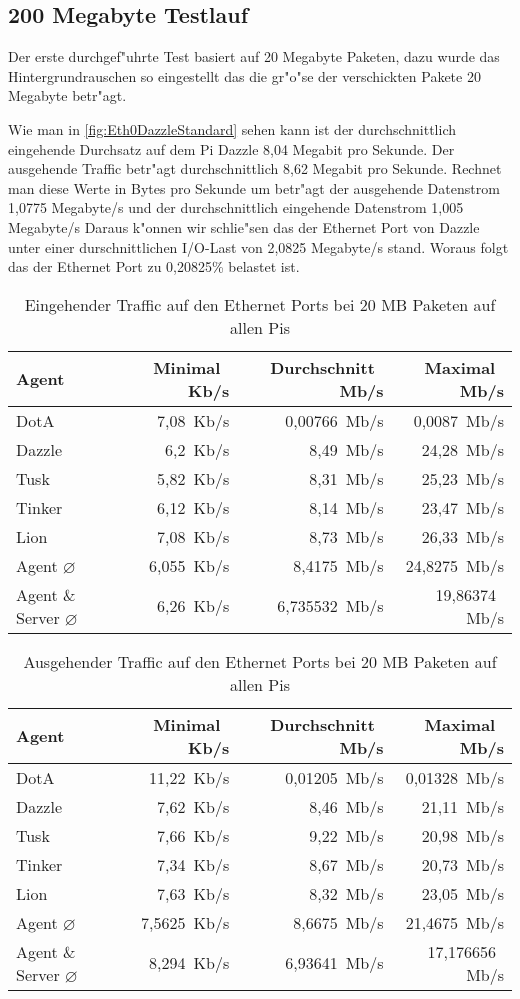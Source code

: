 \subsection{200 Megabyte Testlauf}
\label{subsec:200MBTest}
Der erste durchgef"uhrte Test basiert auf 20 Megabyte Paketen, dazu wurde das Hintergrundrauschen %
so eingestellt das die gr"o"se der verschickten Pakete 20 Megabyte betr"agt. 

Wie man in \cref{fig:Eth0DazzleStandard} sehen kann ist der durchschnittlich eingehende Durchsatz auf dem Pi Dazzle 8,04 Megabit %
pro Sekunde. Der ausgehende Traffic betr"agt durchschnittlich 8,62 Megabit pro Sekunde. Rechnet man diese Werte in Bytes pro Sekunde um %
betr"agt der ausgehende Datenstrom 1,0775 Megabyte/s und der durchschnittlich eingehende Datenstrom 1,005 Megabyte/s %
Daraus k"onnen wir schlie"sen das der Ethernet Port von Dazzle unter einer durschnittlichen I/O-Last von 2,0825 Megabyte/s stand. %
Woraus folgt das der Ethernet Port zu 0,20825\% belastet ist.
\begin{table}
\centering
\begin{tabular}{l%
 r<{\,Kb/s}%
 r<{\,Mb/s}%
 r<{\,Mb/s}%
}
Agent  				& Minimal		& Durchschnitt		& Maximal	\\
\hline
DotA				& 7,08			& 0,00766		& 0,0087	\\		
Dazzle 				& 6,2			& 8,49 			& 24,28		\\
Tusk 				& 5,82			& 8,31			& 25,23		\\
Tinker				& 6,12			& 8,14			& 23,47		\\
Lion				& 7,08			& 8,73			& 26,33		\\ 
Agent $\diameter $	 	& 6,055			& 8,4175		& 24,8275	\\   
Agent \& Server $\diameter$   	& 6,26			& 6,735532		& 19,86374	\\ 

\end{tabular}
\caption{Eingehender Traffic auf den Ethernet Ports bei 20 MB Paketen auf allen Pis}
\label{tab:EingehenderTraffic200MB}
\end{table}

\begin{table}
\centering
\begin{tabular}{l%
 r<{\,Kb/s}%
 r<{\,Mb/s}%
 r<{\,Mb/s}%
}
Agent  				& Minimal		& Durchschnitt		& Maximal	\\	
\hline
DotA				& 11,22			& 0,01205		& 0,01328	\\
Dazzle 				& 7,62			& 8,46	 		& 21,11		\\
Tusk 				& 7,66			& 9,22			& 20,98		\\
Tinker				& 7,34			& 8,67			& 20,73		\\
Lion				& 7,63			& 8,32			& 23,05		\\ 
Agent $\diameter $	 	& 7,5625		& 8,6675		& 21,4675	\\   
Agent \& Server $\diameter$   	& 8,294			& 6,93641		& 17,176656	\\ 

\end{tabular}
\caption{Ausgehender Traffic auf den Ethernet Ports bei 20 MB Paketen auf allen Pis}
\label{tab:AusgehenderTraffic200MB}
\end{table}


